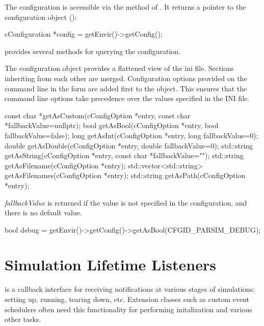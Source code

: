 The configuration is accessible via the  method of .
It returns a pointer to the configuration object ():

\begin{cpp}
cConfiguration *config = getEnvir()->getConfig();
\end{cpp}

 provides several methods for querying the configuration.

\begin{note}
The configuration object provides a flattened view of the ini file. Sections
inheriting from each other are merged. Configuration options provided
on the command line in the form  are added first to the object.
This ensures that the command line options take precedence over the values specified
in the INI file.
\end{note}

\begin{cpp}
const char *getAsCustom(cConfigOption *entry, const char *fallbackValue=nullptr);
bool getAsBool(cConfigOption *entry, bool fallbackValue=false);
long getAsInt(cConfigOption *entry, long fallbackValue=0);
double getAsDouble(cConfigOption *entry, double fallbackValue=0);
std::string getAsString(cConfigOption *entry, const char *fallbackValue="");
std::string getAsFilename(cConfigOption *entry);
std::vector<std::string> getAsFilenames(cConfigOption *entry);
std::string getAsPath(cConfigOption *entry);
\end{cpp}

\textit{fallbackValue} is returned if the value is not specified in the configuration,
and there is no default value.

\begin{cpp}
bool debug = getEnvir()->getConfig()->getAsBool(CFGID_PARSIM_DEBUG);
\end{cpp}


\section{Simulation Lifetime Listeners}
\label{sec:plugin-exts:simulation-lifetime-listeners}

 is a callback interface for
receiving notifications at various stages of simulations: setting up,
running, tearing down, etc. Extension classes such as custom event
schedulers often need this functionality for performing initalization
and various other tasks.


